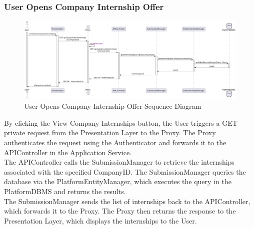 \subsubsection*{User Opens Company Internship Offer}
\begin{figure}[H]
    \centering
    \includegraphics[width=\linewidth]{Latex/Images/DD/SequenceDiagrams/4UserOpensCompanyIntOffer.png}
    \caption{User Opens Company Internship Offer Sequence Diagram}
    \label{fig:useropensintoff}
\end{figure}
By clicking the View Company Internships button, the User triggers a GET private request from the Presentation Layer to the Proxy. The Proxy authenticates the request using the Authenticator and forwards it to the APIController in the Application Service.\\
The APIController calls the SubmissionManager to retrieve the internships associated with the specified CompanyID. The SubmissionManager queries the database via the PlatformEntityManager, which executes the query in the PlatformDBMS and returns the results.\\
The SubmissionManager sends the list of internships back to the APIController, which forwards it to the Proxy. The Proxy then returns the response to the Presentation Layer, which displays the internships to the User.

